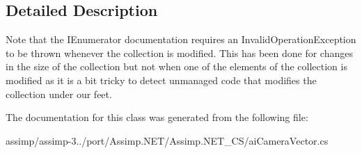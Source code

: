 \subsection{Detailed Description}
Note that the I\+Enumerator documentation requires an Invalid\+Operation\+Exception to be thrown whenever the collection is modified. This has been done for changes in the size of the collection but not when one of the elements of the collection is modified as it is a bit tricky to detect unmanaged code that modifies the collection under our feet. 

The documentation for this class was generated from the following file\+:\begin{DoxyCompactItemize}
\item 
assimp/assimp-\/3../port/\+Assimp.\+N\+E\+T/\+Assimp.\+N\+E\+T\+\_\+\+C\+S/ai\+Camera\+Vector.\+cs\end{DoxyCompactItemize}
